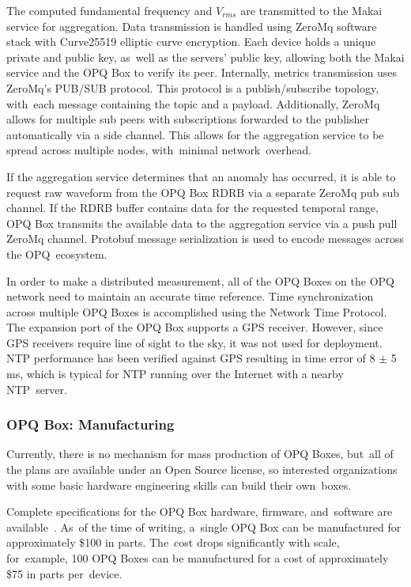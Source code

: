 \documentclass[energies,article,accept,moreauthors,pdftex]{Definitions/mdpi}
\begin{document}
The computed fundamental frequency and $V_{rms}$ are transmitted to the Makai service for aggregation.
Data transmission is handled using ZeroMq software stack with Curve25519 elliptic curve encryption.
Each device holds a unique private and public key, as~well as the servers' public key, allowing both the Makai service and the OPQ Box to verify its peer.
Internally, metrics transmission uses ZeroMq's PUB/SUB protocol.
This protocol is a publish/subscribe topology, with~each message containing the topic and a payload.
Additionally, ZeroMq allows for multiple sub peers with subscriptions forwarded to the publisher automatically via a side channel.
This allows for the aggregation service to be spread across multiple nodes, with~minimal network~overhead.

If the aggregation service determines that an anomaly has occurred, it is able to request raw waveform from the OPQ Box RDRB via a separate ZeroMq pub sub channel.
If the RDRB buffer contains data for the requested temporal range, OPQ Box transmits the available data to the aggregation service via a push pull ZeroMq channel.
Protobuf message serialization is used to encode messages across the OPQ~ecosystem.

In order to make a distributed measurement, all of the OPQ Boxes on the OPQ network need to maintain an accurate time reference.
Time synchronization across multiple OPQ Boxes is accomplished using the Network Time Protocol.
The expansion port of the OPQ Box supports a GPS receiver.
However, since GPS receivers require line of sight to the sky, it was not used for deployment.
NTP performance has been verified against GPS resulting in time error of 8 $\pm$ 5 ms, which is typical for NTP running over the Internet with a nearby NTP~server.

\subsubsection{OPQ Box: Manufacturing}

Currently, there is no mechanism for mass production of OPQ Boxes, but~all of the plans are available under an Open Source license, so interested organizations with some basic hardware engineering skills can build their own~boxes.

Complete specifications for the OPQ Box hardware, firmware, and~software are available~\cite{negrashov_opq_2020}. As~of the time of writing, a~single OPQ Box can be manufactured for approximately \$100 in parts. The~cost drops significantly with scale, for~example, 100 OPQ Boxes can be manufactured for a cost of approximately \$75 in parts per~device.
\end{document}
